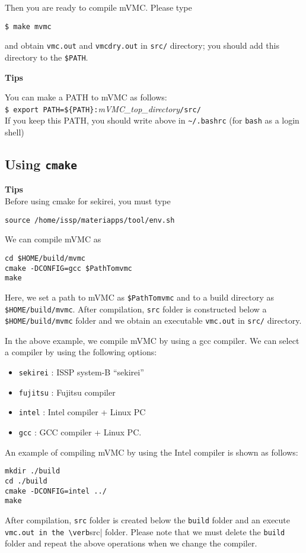 Then you are ready to compile mVMC.
Please type
\begin{verbatim}
$ make mvmc
\end{verbatim}
and obtain \verb|vmc.out| and \verb|vmcdry.out| in \verb|src/| directory;
you should add this directory to the \verb|$PATH|.

\begin{screen}
\Large 
{\bf Tips}
\normalsize

You can make a PATH to mVMC as follows:
\\
\verb|$ export PATH=${PATH}:|\textit{mVMC\_top\_directory}\verb|/src/|
\\
If you keep this PATH, you should write above in \verb|~/.bashrc|
(for \verb|bash| as a login shell)

\end{screen}

\subsection{Using \texttt{cmake}}

\begin{screen}
\Large 
{\bf Tips}
\normalsize\\
Before using cmake for sekirei, you must type 
\begin{verbatim}
source /home/issp/materiapps/tool/env.sh
\end{verbatim}
\end{screen}

We can compile mVMC as
\begin{verbatim}
cd $HOME/build/mvmc
cmake -DCONFIG=gcc $PathTomvmc
make
\end{verbatim}
Here, we set a path to mVMC as \verb|$PathTomvmc|
and to a build directory as \verb| $HOME/build/mvmc|.
After compilation, \verb|src| folder is constructed below a \verb|$HOME/build/mvmc|
folder and we obtain an executable \verb|vmc.out| in \verb|src/| directory.

In the above example,
we compile mVMC by using a gcc compiler.
We can select a compiler by using the following options:
\begin{itemize}
\item \verb|sekirei| : ISSP system-B ``sekirei''
\item \verb|fujitsu| : Fujitsu compiler 
\item \verb|intel| : Intel compiler + Linux PC
\item \verb|gcc| : GCC compiler + Linux PC.
\end{itemize}
An example of compiling mVMC by using the Intel compiler is shown as follows:
\begin{verbatim}
mkdir ./build
cd ./build
cmake -DCONFIG=intel ../
make
\end{verbatim}
After compilation,
\verb|src| folder is created below the \verb|build| folder and
an execute \verb|vmc.out in the \verb|src| folder.
Please note that we must delete the \verb|build| folder and
repeat the above operations when we change the compiler.

